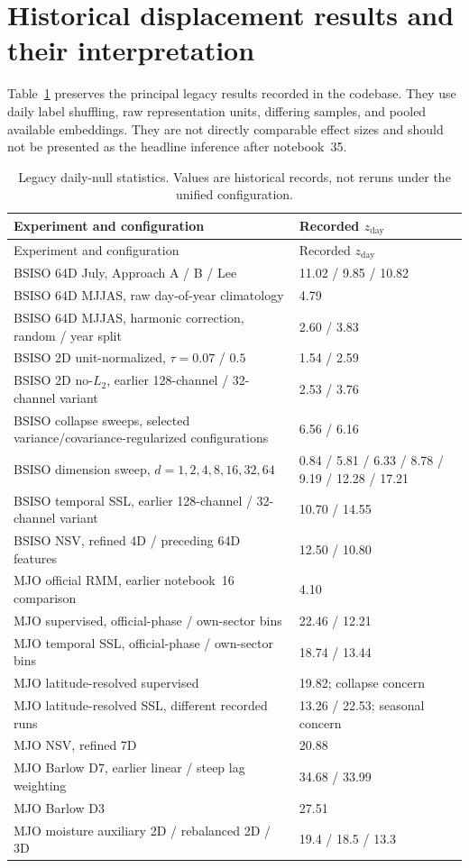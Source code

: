 \documentclass[11pt]{article}
\begin{document}
\section{Historical displacement results and their interpretation}

Table~\ref{tab:legacy} preserves the principal legacy results recorded in the codebase. They use daily label shuffling, raw representation units, differing samples, and pooled available embeddings. They are not directly comparable effect sizes and should not be presented as the headline inference after notebook~35.

\small
\begin{longtable}{p{}p{}}
\caption{Legacy daily-null statistics. Values are historical records, not reruns under the unified configuration.}\label{tab:legacy}\\
\toprule
Experiment and configuration & Recorded $z_{\mathrm{day}}$\\
\midrule
\endfirsthead
\toprule Experiment and configuration & Recorded $z_{\mathrm{day}}$\\\midrule
\endhead
BSISO 64D July, Approach A / B / Lee & 11.02 / 9.85 / 10.82\\
BSISO 64D MJJAS, raw day-of-year climatology & 4.79\\
BSISO 64D MJJAS, harmonic correction, random / year split & 2.60 / 3.83\\
BSISO 2D unit-normalized, $\tau=0.07$ / $0.5$ & 1.54 / 2.59\\
BSISO 2D no-$L_2$, earlier 128-channel / 32-channel variant & 2.53 / 3.76\\
BSISO collapse sweeps, selected variance/covariance-regularized configurations & 6.56 / 6.16\\
BSISO dimension sweep, $d=1,2,4,8,16,32,64$ & 0.84 / 5.81 / 6.33 / 8.78 / 9.19 / 12.28 / 17.21\\
BSISO temporal SSL, earlier 128-channel / 32-channel variant & 10.70 / 14.55\\
BSISO NSV, refined 4D / preceding 64D features & 12.50 / 10.80\\
MJO official RMM, earlier notebook~16 comparison & 4.10\\
MJO supervised, official-phase / own-sector bins & 22.46 / 12.21\\
MJO temporal SSL, official-phase / own-sector bins & 18.74 / 13.44\\
MJO latitude-resolved supervised & 19.82; collapse concern\\
MJO latitude-resolved SSL, different recorded runs & 13.26 / 22.53; seasonal concern\\
MJO NSV, refined 7D & 20.88\\
MJO Barlow D7, earlier linear / steep lag weighting & 34.68 / 33.99\\
MJO Barlow D3 & 27.51\\
MJO moisture auxiliary 2D / rebalanced 2D / 3D & 19.4 / 18.5 / 13.3\\
\bottomrule
\end{longtable}
\normalsize
\end{document}
